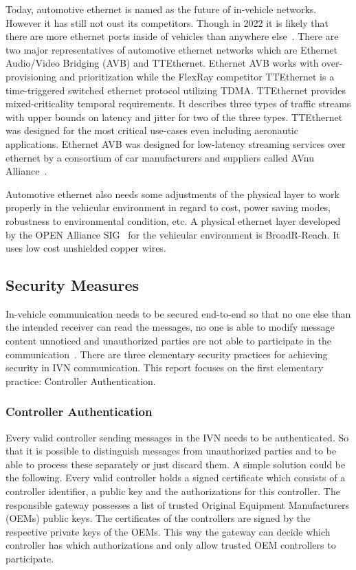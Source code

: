 Today, automotive ethernet is named as the future of in-vehicle networks.
However it has still not oust its competitors. Though in 2022 it is likely that
there are more ethernet ports inside of vehicles than anywhere
else~\cite{Ixia2014}. There are two major representatives of automotive ethernet
networks which are Ethernet Audio/Video Bridging (AVB) and TTEthernet. Ethernet
AVB works with over-provisioning and prioritization while the FlexRay competitor
TTEthernet is a time-triggered switched ethernet protocol utilizing TDMA\@.
TTEthernet provides mixed-criticality temporal requirements. It describes three
types of traffic streams with upper bounds on latency and jitter for two of the
three types. TTEthernet was designed for the most critical use-cases even
including aeronautic applications. Ethernet AVB was designed for low-latency
streaming services over ethernet by a consortium of car manufacturers and
suppliers called AVnu Alliance~\cite{AVNU2018}.

Automotive ethernet also needs some adjustments of the physical layer to work
properly in the vehicular environment in regard to cost, power saving modes,
robustness to environmental condition, etc. A physical ethernet layer developed
by the OPEN Alliance SIG~\cite{SIG2018} for the vehicular environment is
BroadR-Reach. It uses low cost unshielded copper wires. 

\subsection{Security Measures}

In-vehicle communication needs to be secured end-to-end so that no one else than
the intended receiver can read the messages, no one is able to modify message
content unnoticed and unauthorized parties are not able to participate in the
communication~\cite{Lemke2006}. There are three elementary security practices
for achieving security in IVN communication. This report focuses on the first
elementary practice: Controller Authentication.

\subsubsection{Controller Authentication}

Every valid controller sending messages in the IVN needs to be authenticated. So
that it is possible to distinguish messages from unauthorized parties and to be
able to process these separately or just discard them. A simple solution could
be the following. Every valid controller holds a signed certificate which
consists of a controller identifier, a public key and the authorizations for
this controller. The responsible gateway possesses a list of trusted Original
Equipment Manufacturers (OEMs) public keys. The certificates of the controllers
are signed by the respective private keys of the OEMs. This way the gateway can
decide which controller has which authorizations and only allow trusted OEM
controllers to participate.


